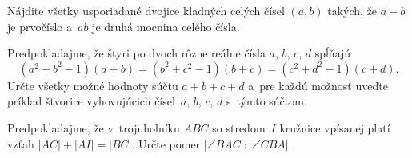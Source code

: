 {%
Nájdite všetky usporiadané dvojice kladných celých čísel $(a,b)$ takých, že $a-b$ je prvočíslo a~$ab$ je druhá mocnina celého čísla.}

{%
Predpokladajme, že štyri po dvoch rôzne reálne čísla $a$, $b$, $c$, $d$ spĺňajú
$$
(a^2+b^2-1)(a+b) = (b^2+c^2-1)(b+c) = (c^2+d^2-1)(c+d).
$$
Určte všetky možné hodnoty súčtu $a+b+c+d$ a~pre každú možnosť uveďte príklad štvorice vyhovujúcich čísel~$a$, $b$, $c$, $d$ s~týmto súčtom.
}

{%
Predpokladajme, že v~trojuholníku $ABC$ so stredom~$I$ kružnice vpísanej platí vzťah $|AC|+|AI|=|BC|$. Určte pomer $|\angle BAC| :|\angle CBA|$.
}
